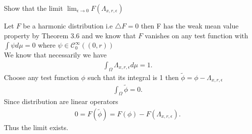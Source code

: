\begin{exercise}[c]
  Show that the limit $\lim_{\epsilon \to 0} F(\Lambda_{x,r,\epsilon })$ 
\end{exercise}
\begin{solution}
 Let $F$ be a harmonic distribution i.e $\triangle F = 0$ then  F has the weak mean value property by Theorem 3.6
 and we know that $F$ vanishes on any test function with $\int \psi d\mu = 0$ where $\psi \in  \mathcal{C}^{\infty}_0((0,r)) $\\
 We know that necessarily  we have 
\begin{align*}
 \int_\Omega  \Lambda_{x,r,\epsilon }  d\mu = 1 
.\end{align*} 
Choose any test function $\phi $ such that its integral is 1  then $\tilde{\phi } = \phi - \Lambda_{x,r,\epsilon}$  
\begin{align*}
  \int_\Omega  \tilde{\phi } = 0
.\end{align*}
Since distribution are linear operators 
\begin{align*}
  0 = F(\tilde{\phi }) = F(\phi) - F(\Lambda_{x,r,\epsilon })
.\end{align*}
Thus the limit exists.
\end{solution}
